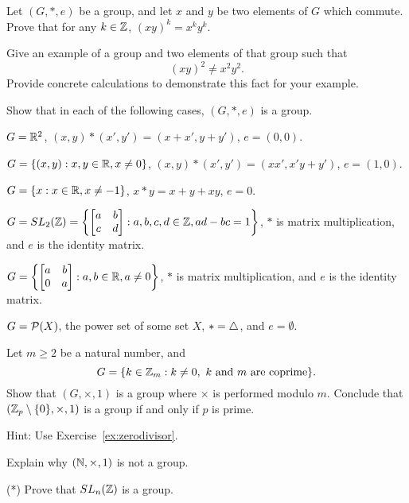 \begin{exercises}
  \item Let $(G, \ast, e)$ be a group, and let $x$ and $y$ be two elements
    of $G$ which commute.  Prove that for any $k \in \mathbb{Z}$, $(xy)^{k} =
    x^{k}y^{k}$.

  \item Give an example of a group and two elements of that group such that
    \[
      (xy)^{2} \ne x^{2}y^{2}.
    \]
    Provide concrete calculations to demonstrate this fact for your example.
  
  \item Show that in each of the following cases, $(G, \ast, e)$ is a group.
    \begin{theoremenum}
      \item $G = \mathbb{R}^{2}$, $(x,y) \ast (x',y') = (x + x', y + y')$, $e = (0,0)$.

      \item $G = \{(x,y) : x,y \in \mathbb{R}, x \ne 0\}$, $(x,y) \ast (x',y') = (xx', x'y + y')$, $e = (1,0)$.

      \item $G = \{x : x \in \mathbb{R}, x \ne -1\}$, $x \ast y = x + y + xy$, $e = 0$.

      \item $\displaystyle G = SL_{2}(\mathbb{Z}) = \left\{
        \begin{bmatrix}
          a & b \\ c & d
        \end{bmatrix}
        : a, b, c, d \in \mathbb{Z}, ad - bc = 1
        \right\}$, $\ast$ is matrix multiplication, and $e$ is the identity
        matrix.

      \item $\displaystyle G = \left\{
        \begin{bmatrix}
          a & b \\ 0 & a
        \end{bmatrix}
        : a, b \in \mathbb{R}, a \ne 0
        \right\}$, $\ast$ is matrix multiplication, and $e$ is the identity
        matrix.
      
      \item $G = \mathcal{P}(X)$, the power set of some set $X$, $\ast = \bigtriangleup$,
        and $e = \emptyset$.
    \end{theoremenum}
    
    \item Let $m \ge 2$ be a natural number, and
      \[
        G = \{k \in \mathbb{Z}_{m}: k \ne 0, \text{ $k$ and $m$ are
        coprime}\}.
      \]
      Show that $(G, \times, 1)$
      is a group where $\times$ is performed modulo $m$.  Conclude that
      $(\mathbb{Z}_{p} \setminus \{0\}, \times, 1)$ is a group if and only if
      $p$ is prime.
      
      Hint: Use Exercise~\ref{ex:zerodivisor}.
      
    \item Explain why $(\mathbb{N}, \times, 1)$ is not a group.
    
    \item (*) Prove that $SL_{n}(\mathbb{Z})$ is a group.
\end{exercises}

